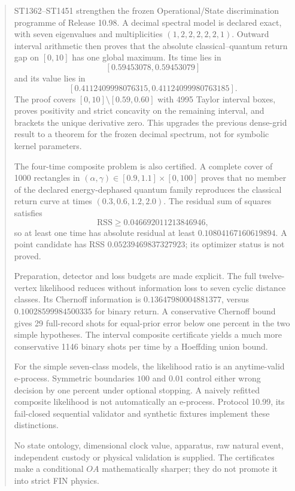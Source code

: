 \documentclass[11pt,a4paper]{article}
\begin{document}
\begin{abstract}
ST1362--ST1451 strengthen the frozen Operational/State discrimination programme
of Release 10.98.  A decimal spectral model is declared exact, with seven
eigenvalues and multiplicities $(1,2,2,2,2,2,1)$.  Outward interval arithmetic
then proves that the absolute classical--quantum return gap on $[0,10]$ has one
global maximum.  Its time lies in
\[
[0.59453078,0.59453079]
\]
and its value lies in
\[
[0.4112409998076315,0.41124099980763185].
\]
The proof covers $[0,10]\setminus[0.59,0.60]$ with 4995 Taylor interval boxes,
proves positivity and strict concavity on the remaining interval, and brackets
the unique derivative zero.  This upgrades the previous dense-grid result to a
theorem for the frozen decimal spectrum, not for symbolic kernel parameters.

The four-time composite problem is also certified.  A complete cover of 1000
rectangles in
$(\alpha,\gamma)\in[0.9,1.1]\times[0,100]$ proves that no member of the
declared energy-dephased quantum family reproduces the classical return curve
at times $(0.3,0.6,1.2,2.0)$.  The residual sum of squares satisfies
\[
\mathrm{RSS}\ge0.046692011213846946,
\]
so at least one time has absolute residual at least $0.10804167160619894$.
A point candidate has RSS $0.05239469837327923$; its optimizer status is not
proved.

Preparation, detector and loss budgets are made explicit.  The full twelve-
vertex likelihood reduces without information loss to seven cyclic distance
classes.  Its Chernoff information is $0.13647980004881377$, versus
$0.10028599984500335$ for binary return.  A conservative Chernoff bound gives
29 full-record shots for equal-prior error below one percent in the two simple
hypotheses.  The interval composite certificate yields a much more
conservative 1146 binary shots per time by a Hoeffding union bound.

For the simple seven-class models, the likelihood ratio is an anytime-valid
e-process.  Symmetric boundaries $100$ and $0.01$ control either wrong
decision by one percent under optional stopping.  A naively refitted composite
likelihood is not automatically an e-process.  Protocol 10.99, its fail-closed
sequential validator and synthetic fixtures implement these distinctions.

No state ontology, dimensional clock value, apparatus, raw natural event,
independent custody or physical validation is supplied.  The certificates
make a conditional $OA$ mathematically sharper; they do not promote it into
strict FIN physics.
\end{abstract}
\end{document}
